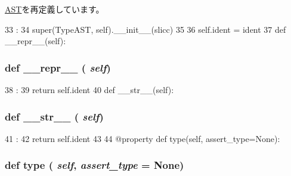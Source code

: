\hyperlink{classslicc_1_1ast_1_1AST_1_1AST_ac775ee34451fdfa742b318538164070e}{AST}を再定義しています。


\begin{DoxyCode}
33                                     :
34         super(TypeAST, self).__init__(slicc)
35 
36         self.ident = ident
37 
    def __repr__(self):
\end{DoxyCode}
\hypertarget{classslicc_1_1ast_1_1TypeAST_1_1TypeAST_ad8b9328939df072e4740cd9a63189744}{
\subsubsection[{\_\-\_\-repr\_\-\_\-}]{\setlength{\rightskip}{0pt plus 5cm}def \_\-\_\-repr\_\-\_\- ( {\em self})}}
\label{classslicc_1_1ast_1_1TypeAST_1_1TypeAST_ad8b9328939df072e4740cd9a63189744}



\begin{DoxyCode}
38                       :
39         return self.ident
40 
    def __str__(self):
\end{DoxyCode}
\hypertarget{classslicc_1_1ast_1_1TypeAST_1_1TypeAST_aa7a4b9bc0941308e362738503137460e}{
\subsubsection[{\_\-\_\-str\_\-\_\-}]{\setlength{\rightskip}{0pt plus 5cm}def \_\-\_\-str\_\-\_\- ( {\em self})}}
\label{classslicc_1_1ast_1_1TypeAST_1_1TypeAST_aa7a4b9bc0941308e362738503137460e}



\begin{DoxyCode}
41                      :
42         return self.ident
43 
44     @property
    def type(self, assert_type=None):
\end{DoxyCode}
\hypertarget{classslicc_1_1ast_1_1TypeAST_1_1TypeAST_a6fd3149402a39b8fbf719937bad52a38}{
\subsubsection[{type}]{\setlength{\rightskip}{0pt plus 5cm}def type ( {\em self}, \/   {\em assert\_\-type} = {\ttfamily None})}}
\label{classslicc_1_1ast_1_1TypeAST_1_1TypeAST_a6fd3149402a39b8fbf719937bad52a38}



